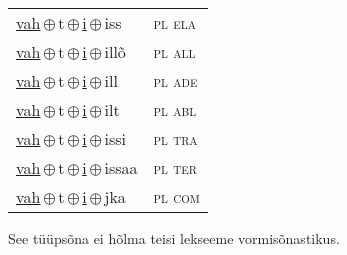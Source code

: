 \begin{minipage}{\textwidth}
\begin{sideways}
\begin{tabular}{l l}
\underline{vah}\,$\oplus$\,t\,$\oplus$\,\underline{i}\,$\oplus$\,iss & \textsc{ pl ela } \\
\underline{vah}\,$\oplus$\,t\,$\oplus$\,\underline{i}\,$\oplus$\,illõ & \textsc{ pl all } \\
\underline{vah}\,$\oplus$\,t\,$\oplus$\,\underline{i}\,$\oplus$\,ill & \textsc{ pl ade } \\
\underline{vah}\,$\oplus$\,t\,$\oplus$\,\underline{i}\,$\oplus$\,ilt & \textsc{ pl abl } \\
\underline{vah}\,$\oplus$\,t\,$\oplus$\,\underline{i}\,$\oplus$\,issi & \textsc{ pl tra } \\
\underline{vah}\,$\oplus$\,t\,$\oplus$\,\underline{i}\,$\oplus$\,issaa & \textsc{ pl ter } \\
\underline{vah}\,$\oplus$\,t\,$\oplus$\,\underline{i}\,$\oplus$\,jka & \textsc{ pl com } \\
\end{tabular}
\end{sideways}
\label{tab:tüüpsõnamall-vahti}

\end{minipage}

 
\vspace{1em}
\noindent See tüüpsõna ei hõlma teisi lekseeme vormi\-sõnastikus.
